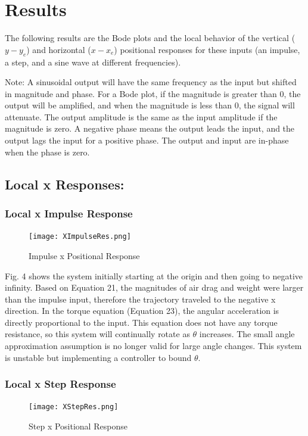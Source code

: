 \documentclass[conference]{IEEEtran}
\begin{document}
\newpage
\section{Results}
The following results are the Bode plots and the local behavior of the vertical ($y - y_e$) and horizontal ($x - x_e$) positional responses for these inputs (an impulse, a step, and a sine wave at different frequencies). 

Note: A sinusoidal output will have the same frequency as the input but shifted in magnitude and phase. For a Bode plot, if the magnitude is greater than 0, the output will be amplified, and when the magnitude is less than 0, the signal will attenuate. The output amplitude is the same as the input amplitude if the magnitude is zero. A negative phase means the output leads the input, and the output lags the input for a positive phase. The output and input are in-phase when the phase is zero.

\subsection{Local x Responses:}
\subsubsection{Local x Impulse Response} 
\begin{figure}[htbp]
\centering
\centerline{\texttt{[image: XImpulseRes.png]}}
\caption{Impulse x Positional Response}
\label{figure}
\end{figure}


Fig. 4 shows the system initially starting at the origin and then going to negative infinity. Based on Equation 21, the magnitudes of air drag and weight were larger than the impulse input, therefore the trajectory traveled to the negative x direction. In the torque equation (Equation 23), the angular acceleration is directly proportional to the input. This equation does not have any torque resistance, so this system will continually rotate as $\theta$ increases. The small angle approximation assumption is no longer valid for large angle changes. This system is unstable but implementing a controller to bound $\theta$.

\newpage
\subsubsection{Local x Step Response} 
\begin{figure}[htbp]
\centerline{\texttt{[image: XStepRes.png]}}
\caption{Step x Positional Response}
\label{figure}
\end{figure}
\end{document}
